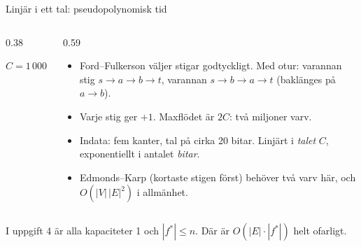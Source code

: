 {\kaninbg
\begin{frame}{\kh Linjär i ett tal: pseudopolynomisk tid}
\begin{columns}[T]
\begin{column}{0.38\textwidth}
\centering
{}\par\smallskip
{\footnotesize $C=1\,000\,000\approx2^{20}$}
\end{column}
\begin{column}{0.59\textwidth}
\small
\begin{itemize}\setlength{\itemsep}{2pt}
  \item Ford--Fulkerson väljer stigar godtyckligt. Med otur: varannan stig $s\to a\to b\to t$,
        varannan $s\to b\to a\to t$ (baklänges på $a\to b$).
  \item Varje stig ger $+1$. Maxflödet är $2C$: två miljoner varv.
  \item Indata: fem kanter, tal på cirka 20 bitar. Linjärt i \emph{talet} $C$, exponentiellt
        i antalet \emph{bitar}.
  \item Edmonds--Karp (kortaste stigen först) behöver två varv här, och $O(|V|\,|E|^2)$ i allmänhet.
\end{itemize}
\end{column}
\end{columns}
\vfill
\begin{kaninbox}[fontupper=\footnotesize]
I uppgift 4 är alla kapaciteter 1 och $|f^*|\le n$. Där är $O(|E|\cdot|f^*|)$ helt ofarligt.
\end{kaninbox}
\end{frame}}

